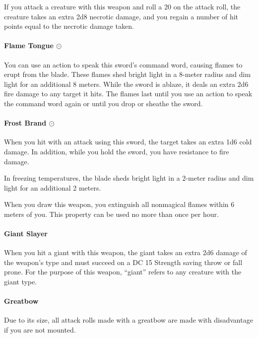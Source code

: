        If you attack a creature with this weapon and roll a 20 on the attack roll, the creature takes an extra 2d8 necrotic damage, and you regain a number of hit points equal to the necrotic damage taken.
    \paragraph{Flame Tongue $\odot$}
        You can use an action to speak this sword's command word, causing flames to erupt from the blade.
        These flames shed bright light in a 8-meter radius and dim light for an additional 8 meters.
        While the sword is ablaze, it deals an extra 2d6 fire damage to any target it hits.
        The flames last until you use an action to speak the command word again or until you drop or sheathe the sword.
    \paragraph{Frost Brand $\odot$}
        When you hit with an attack using this sword, the target takes an extra 1d6 cold damage.
        In addition, while you hold the sword, you have resistance to fire damage.

        In freezing temperatures, the blade sheds bright light in a 2-meter radius and dim light for an additional 2 meters.

        When you draw this weapon, you extinguish all nonmagical flames within 6 meters of you.
        This property can be used no more than once per hour.
    \paragraph{Giant Slayer}
        When you hit a giant with this weapon, the giant takes an extra 2d6 damage of the weapon's type and must succeed on a DC 15 Strength saving throw or fall prone.
        For the purpose of this weapon, ``giant'' refers to any creature with the giant type.
    \paragraph{Greatbow}
        Due to its size, all attack rolls made with a greatbow are made with disadvantage if you are not mounted.
